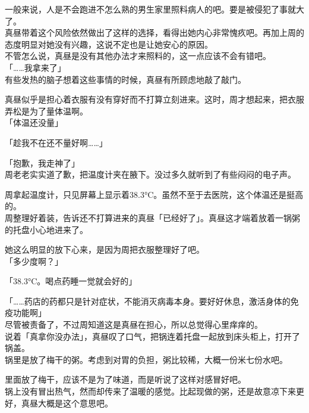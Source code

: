 一般来说，人是不会跑进不怎么熟的男生家里照料病人的吧。要是被侵犯了事就大了。\\

真昼带着这个风险依然做出了这样的选择，看得出她内心非常愧疚吧。再加上周的态度明显对她没有兴趣，这说不定也是让她安心的原因。\\

不管怎么说，真昼是没有其他办法才来照料的，这一点应该不会有错吧。\\

「……我拿来了」\\

有些发热的脑子想着这些事情的时候，真昼有所顾虑地敲了敲门。

真昼似乎是担心着衣服有没有穿好而不打算立刻进来。这时，周才想起来，把衣服弄松是为了量体温啊。\\

「体温还没量」

「趁我不在还不量好啊……」

「抱歉，我走神了」\\

周老老实实道了歉，把温度计夹在腋下。没过多久就听到了有些闷闷的电子声。

周拿起温度计，只见屏幕上显示着38.3°C。虽然不至于去医院，这个体温还是挺高的。\\

周整理好着装，告诉还不打算进来的真昼「已经好了」。真昼这才端着放着一锅粥的托盘小心地进来了。

她这么明显的放下心来，是因为周把衣服整理好了吧。\\

「多少度啊？」

「38.3°C。喝点药睡一觉就会好的」

「……药店的药都只是针对症状，不能消灭病毒本身。要好好休息，激活身体的免疫功能啊」\\

尽管被责备了，不过周知道这是真昼在担心，所以总觉得心里痒痒的。\\

说着「真拿你没办法」，真昼叹了口气，把锅连着托盘一起放到床头柜上，打开了锅盖。\\

锅里是放了梅干的粥。考虑到对胃的负担，粥比较稀，大概一份米七份水吧。

里面放了梅干，应该不是为了味道，而是听说了这样对感冒好吧。\\

锅上没有冒出热气，然而却传来了温暖的感觉。比起现做的粥，还是故意凉下来更好，真昼大概是这个意思吧。\\

